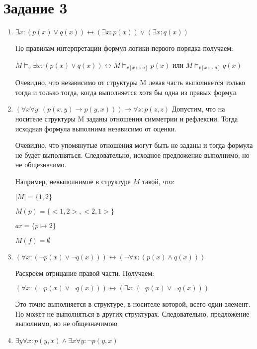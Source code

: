 \documentclass{article}
\begin{document}
\section*{Задание 3}
\begin{enumerate}
    \item 
        \(\exists x : (p(x) \lor q(x)) \leftrightarrow (\exists x : p(x)) \lor (\exists x : q(x))\)
        
        По правилам интерпретации формул логики первого порядка получаем:

        \(
            M \models_v \exists x : (p(x) \lor q(x)) \leftrightarrow
            M \models_{v[x \mapsto a]} p(x)
        \) или \(M \models_{v[x \mapsto a]} q(x)\)

        Очевидно, что независимо от структуры M левая часть выполняется только 
        тогда и только тогда, когда выполняется хотя бы одна из правых формул.
    \item 
        \(
            (\forall x \forall y : (p(x,y) \rightarrow p(y,x)))
            \rightarrow \forall z : p(z,z)
        \)
        Допустим, что на носителе структуры M заданы отношения симметрии и рефлексии.
        Тогда исходная формула выполнима независимо от оценки.

        Очевидно, что упомянутые отношения могут быть не заданы и тогда формула не будет выполняться.
        Следовательно, исходное предложение выполнимо, но не общезначимо.

        Например, невыполнимое в структуре \(M\) такой, что:

            \(|M| = \{1, 2\}\)

            \(M(p) = \{<1,2>, <2,1>\}\)

            \(ar = \{p \mapsto 2\}\)

            \(M(f) = \emptyset\)
    \item 
        \(
            (\forall x : (\neg p(x) \lor \neg q(x))) 
            \leftrightarrow (\neg \forall x : (p(x) \land q(x)))
        \)

        Раскроем отрицание правой части. Получаем:

        \(
            (\forall x : (\neg p(x) \lor \neg q(x))) 
            \leftrightarrow (\exists x : (\neg p(x) \lor \neg q(x)))
        \)

        Это точно выполняется в структуре, в носителе которой, всего один элемент. 
        Но может не выполняться в других структурах. Следовательно, предложение выполнимо, но не общезначимою
    \item 
        \(\exists y \forall x : p(y, x) \land \exists x \forall y : \neg p(y, x)\)
        

\end{enumerate}
\end{document}
